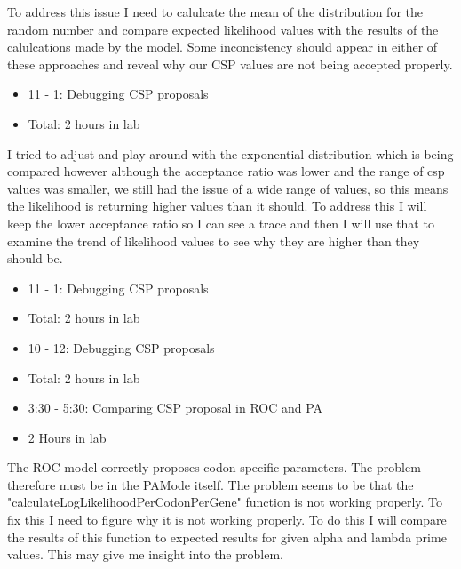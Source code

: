 \documentclass[12pt,hyperref]{labbook}
\begin{document}
To address this issue I need to calulcate the mean of the distribution for the random number
and compare expected likelihood values with the results of the calulcations made by the model.
Some inconcistency should appear in either of these approaches and reveal why our CSP values
are not being accepted properly.
\begin{itemize}
    \item 11 - 1: Debugging CSP proposals
    \item Total: 2 hours in lab
\end{itemize}
    I tried to adjust and play around with the exponential distribution which is being compared
    however although the acceptance ratio was lower and the range of csp values was smaller, we
    still had the issue of a wide range of values, so this means the likelihood is returning
    higher values than it should. To address this I will keep the lower acceptance ratio so I can
    see a trace and then I will use that to examine the trend of likelihood values to see why
    they are higher than they should be.
\begin{itemize}
    \item 11 - 1: Debugging CSP proposals
    \item Total: 2 hours in lab
\end{itemize}
\begin{itemize}
    \item 10 - 12: Debugging CSP proposals
    \item Total: 2 hours in lab
\end{itemize}
\begin{itemize}
    \item 3:30 - 5:30: Comparing CSP proposal in ROC and PA
    \item 2 Hours in lab
\end{itemize}
    The ROC model correctly proposes codon specific parameters. The problem therefore must be in the PAMode itself.
    The problem seems to be that the "calculateLogLikelihoodPerCodonPerGene" function is not working properly. To fix
    this I need to figure why it is not working properly. To do this I will compare the results of this function to expected
    results for given alpha and lambda prime values. This may give me insight into the problem.
\end{document}
